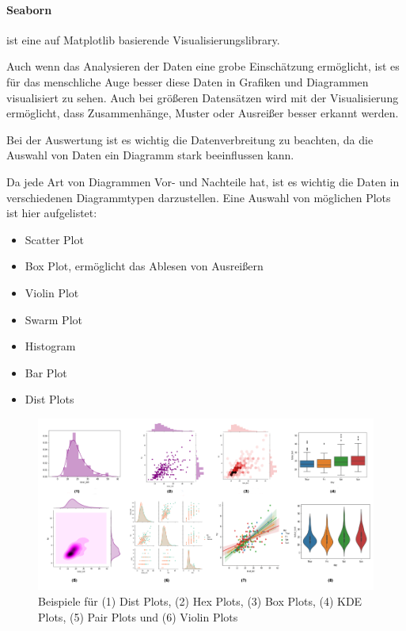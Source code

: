 \paragraph{Seaborn} ist eine auf Matplotlib basierende Visualisierungslibrary.

Auch wenn das Analysieren der Daten eine grobe Einschätzung ermöglicht, ist es für das menschliche Auge besser diese Daten in Grafiken und Diagrammen visualisiert zu sehen. Auch bei größeren Datensätzen wird mit der Visualisierung ermöglicht, dass Zusammenhänge, Muster oder Ausreißer besser erkannt werden.

Bei der Auswertung ist es wichtig die Datenverbreitung zu beachten, da die Auswahl von Daten ein Diagramm stark beeinflussen kann.

Da jede Art von Diagrammen Vor- und Nachteile hat, ist es wichtig die Daten in verschiedenen Diagrammtypen darzustellen. Eine Auswahl von möglichen Plots ist hier aufgelistet:

\begin{itemize}
    \item Scatter Plot
    \item Box Plot, ermöglicht das Ablesen von Ausreißern
    \item Violin Plot
    \item Swarm Plot
    \item Histogram
    \item Bar Plot
    \item Dist Plots
\end{itemize}

\begin{figure}[H]
    \centering
    \includegraphics[scale=0.45]{sections/machine-learning/images/seaborn.png}
    \caption{Beispiele für (1) Dist Plots, (2) Hex Plots, (3) Box Plots, (4) KDE Plots, (5) Pair Plots und (6) Violin Plots}
\end{figure}